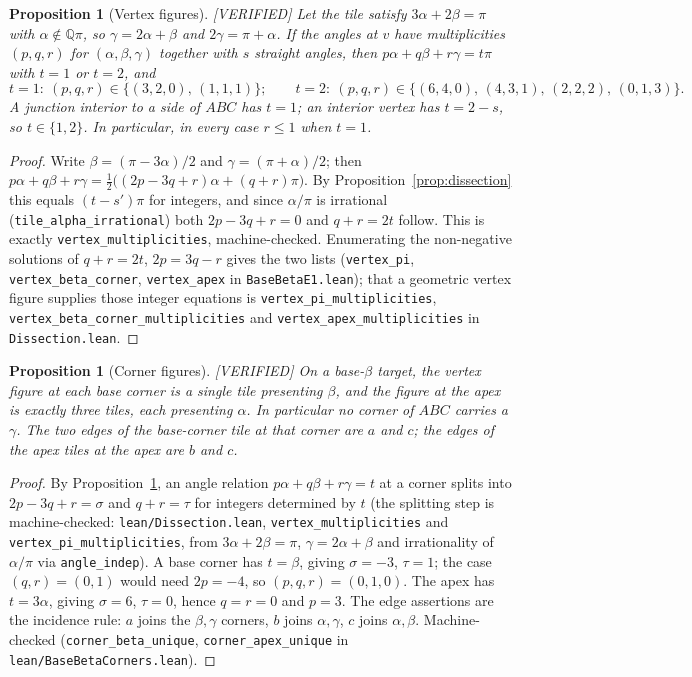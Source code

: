 \documentclass[11pt,reqno]{amsart}
\theoremstyle{plain}
\newtheorem{proposition}[theorem]{Proposition}
\theoremstyle{definition}
\newcommand{\Q}{\mathbb{Q}}
\newcommand{\lab}[1]{\hfill\textnormal{\footnotesize\textsc{[#1]}}}
\begin{document}
\begin{proposition}[Vertex figures]\label{prop:vertexfigures}\lab{VERIFIED}
Let the tile satisfy $3\alpha+2\beta=\pi$ with $\alpha\notin\Q\pi$, so $\gamma=2\alpha+\beta$ and
$2\gamma=\pi+\alpha$. If the angles at $v$ have multiplicities $(p,q,r)$ for $(\alpha,\beta,\gamma)$
together with $s$ straight angles, then $p\alpha+q\beta+r\gamma=t\pi$ with $t=1$ or $t=2$, and
\[
t=1:\ (p,q,r)\in\{(3,2,0),\,(1,1,1)\};\qquad
t=2:\ (p,q,r)\in\{(6,4,0),\,(4,3,1),\,(2,2,2),\,(0,1,3)\}.
\]
A junction interior to a side of $ABC$ has $t=1$; an interior vertex has $t=2-s$, so $t\in\{1,2\}$.
In particular, in every case $r\le1$ when $t=1$.
\end{proposition}

\begin{proof}
Write $\beta=(\pi-3\alpha)/2$ and $\gamma=(\pi+\alpha)/2$; then
$p\alpha+q\beta+r\gamma=\tfrac12\bigl((2p-3q+r)\alpha+(q+r)\pi\bigr)$. By
Proposition~\ref{prop:dissection} this equals $(t-s')\pi$ for integers, and since $\alpha/\pi$ is
irrational (\texttt{tile\_alpha\_irrational}) both $2p-3q+r=0$ and $q+r=2t$ follow. This is exactly
\texttt{vertex\_multiplicities}, machine-checked. Enumerating the non-negative solutions of
$q+r=2t$, $2p=3q-r$ gives the two lists (\texttt{vertex\_pi}, \texttt{vertex\_beta\_corner},
\texttt{vertex\_apex} in \texttt{BaseBetaE1.lean}); that a geometric vertex figure supplies those
integer equations is \texttt{vertex\_pi\_multiplicities},
\texttt{vertex\_beta\_corner\_multiplicities} and \texttt{vertex\_apex\_multiplicities} in
\texttt{Dissection.lean}.
\end{proof}

\begin{proposition}[Corner figures]\label{prop:cornerfig}\lab{VERIFIED}
On a base-$\beta$ target, the vertex figure at each base corner is a \emph{single} tile presenting
$\beta$, and the figure at the apex is \emph{exactly three} tiles, each presenting $\alpha$. In
particular no corner of $ABC$ carries a $\gamma$. The two edges of the base-corner tile at that
corner are $a$ and $c$; the edges of the apex tiles at the apex are $b$ and $c$.
\end{proposition}

\begin{proof}
By Proposition~\ref{prop:vertexfigures}, an angle relation $p\alpha+q\beta+r\gamma=t$ at a corner
splits into $2p-3q+r=\sigma$ and $q+r=\tau$ for integers determined by $t$ (the splitting step is
machine-checked: \texttt{lean/Dissection.lean}, \texttt{vertex\_multiplicities} and
\texttt{vertex\_pi\_multiplicities}, from $3\alpha+2\beta=\pi$, $\gamma=2\alpha+\beta$ and
irrationality of $\alpha/\pi$ via \texttt{angle\_indep}). A base corner has
$t=\beta$, giving $\sigma=-3$, $\tau=1$; the case $(q,r)=(0,1)$ would need $2p=-4$, so
$(p,q,r)=(0,1,0)$. The apex has $t=3\alpha$, giving $\sigma=6$, $\tau=0$, hence $q=r=0$ and $p=3$.
The edge assertions are the incidence rule: $a$ joins the $\beta,\gamma$ corners, $b$ joins
$\alpha,\gamma$, $c$ joins $\alpha,\beta$. Machine-checked (\texttt{corner\_beta\_unique},
\texttt{corner\_apex\_unique} in \texttt{lean/BaseBetaCorners.lean}).
\end{proof}
\end{document}
